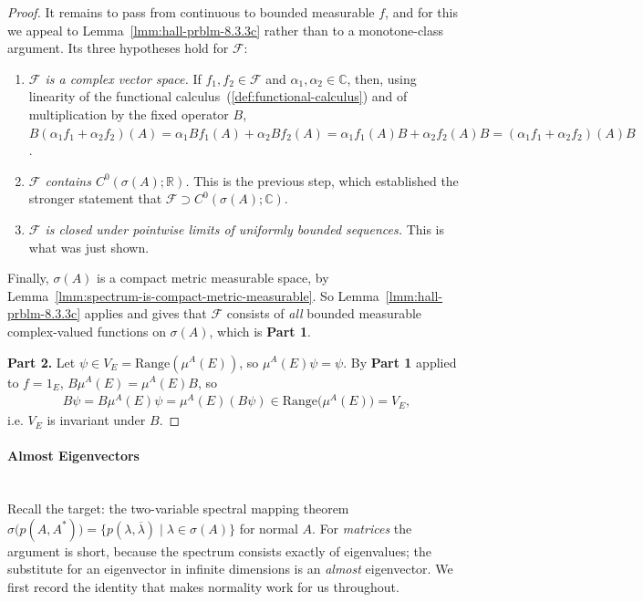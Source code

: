 \begin{proof}
It remains to pass from continuous to bounded measurable $f$, and for this we appeal to Lemma~\ref{lmm:hall-prblm-8.3.3c} rather than to a monotone-class argument. Its three hypotheses hold for $\mathcal{F}$:
\begin{enumerate}
    \item \textit{$\mathcal{F}$ is a complex vector space.} If $f_1,f_2 \in \mathcal{F}$ and $\alpha_1,\alpha_2 \in \mathbb{C}$, then, using linearity of the functional calculus~(\ref{def:functional-calculus}) and of multiplication by the fixed operator $B$, $B(\alpha_1f_1+\alpha_2f_2)(A) = \alpha_1Bf_1(A) + \alpha_2Bf_2(A) = \alpha_1f_1(A)B + \alpha_2f_2(A)B = (\alpha_1f_1+\alpha_2f_2)(A)B$.
    \item \textit{$\mathcal{F}$ contains $C^0(\sigma(A);\mathbb{R})$.} This is the previous step, which established the stronger statement that $\mathcal{F} \supset C^0(\sigma(A);\mathbb{C})$.
    \item \textit{$\mathcal{F}$ is closed under pointwise limits of uniformly bounded sequences.} This is what was just shown.
\end{enumerate}
Finally, $\sigma(A)$ is a compact metric measurable space, by Lemma~\ref{lmm:spectrum-is-compact-metric-measurable}. So Lemma~\ref{lmm:hall-prblm-8.3.3c} applies and gives that $\mathcal{F}$ consists of \textit{all} bounded measurable complex-valued functions on $\sigma(A)$, which is \textbf{Part 1}.

\textbf{Part 2.} Let $\psi \in V_E = \text{Range}(\mu^A(E))$, so $\mu^A(E)\psi = \psi$. By \textbf{Part 1} applied to $f = 1_E$, $B\mu^A(E) = \mu^A(E)B$, so
\begin{align}
    B\psi = B\mu^A(E)\psi = \mu^A(E)(B\psi) \in \text{Range}\big(\mu^A(E)\big) = V_E,
\end{align}
i.e. $V_E$ is invariant under $B$.
\end{proof}

\paragraph{Almost Eigenvectors}\mbox{}\\
Recall the target: the two-variable spectral mapping theorem $\sigma\big(p(A,A^*)\big) = \{ p(\lambda,\overline\lambda) \mid \lambda \in \sigma(A) \}$ for normal $A$. For \textit{matrices} the argument is short, because the spectrum consists exactly of eigenvalues; the substitute for an eigenvector in infinite dimensions is an \textit{almost} eigenvector. We first record the identity that makes normality work for us throughout.

